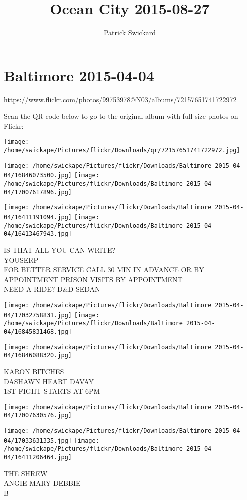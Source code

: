 \documentclass[10pt,letterpaper]{article}
\title{Ocean City 2015-08-27}
\author{Patrick Swickard}
\date{}
\begin{document}
\section*{Baltimore 2015-04-04}

\url{https://www.flickr.com/photos/99753978@N03/albums/72157651741722972}

Scan the QR code below to go to the original album with full-size photos on Flickr:

\texttt{[image: /home/swickape/Pictures/flickr/Downloads/qr/72157651741722972.jpg]}
\pagebreak

\texttt{[image: /home/swickape/Pictures/flickr/Downloads/Baltimore 2015-04-04/16846073500.jpg]}
\texttt{[image: /home/swickape/Pictures/flickr/Downloads/Baltimore 2015-04-04/17007617896.jpg]}

\texttt{[image: /home/swickape/Pictures/flickr/Downloads/Baltimore 2015-04-04/16411191094.jpg]}
\texttt{[image: /home/swickape/Pictures/flickr/Downloads/Baltimore 2015-04-04/16413467943.jpg]}

IS THAT ALL YOU CAN WRITE?\\
YOUSERP\\
FOR BETTER SERVICE CALL 30 MIN IN ADVANCE OR BY APPOINTMENT PRISON VISITS BY APPOINTMENT\\
NEED A RIDE?  D\&D SEDAN
\pagebreak

\texttt{[image: /home/swickape/Pictures/flickr/Downloads/Baltimore 2015-04-04/17032758831.jpg]}
\texttt{[image: /home/swickape/Pictures/flickr/Downloads/Baltimore 2015-04-04/16845831468.jpg]}

\texttt{[image: /home/swickape/Pictures/flickr/Downloads/Baltimore 2015-04-04/16846088320.jpg]}

KARON BITCHES\\
DASHAWN HEART DAVAY\\
1ST FIGHT STARTS AT 6PM
\pagebreak

\texttt{[image: /home/swickape/Pictures/flickr/Downloads/Baltimore 2015-04-04/17007630576.jpg]}

\vspace{0.25in}
\texttt{[image: /home/swickape/Pictures/flickr/Downloads/Baltimore 2015-04-04/17033631335.jpg]}
\texttt{[image: /home/swickape/Pictures/flickr/Downloads/Baltimore 2015-04-04/16411206464.jpg]}

THE SHREW\\
ANGIE MARY DEBBIE\\
B
\pagebreak
\end{document}
